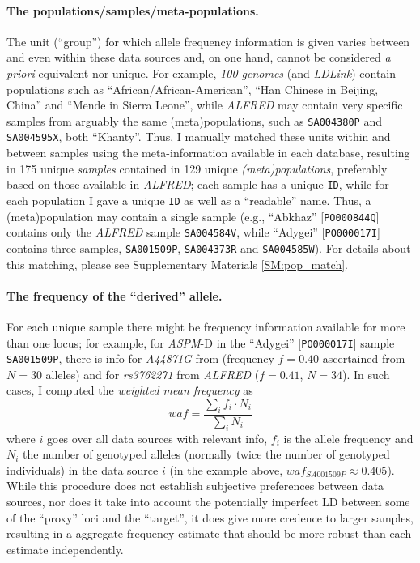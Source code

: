 \documentclass[twoside,onecolumn]{article}
\begin{document}
\paragraph{The populations/samples/meta-populations.}
The unit (``group'') for which allele frequency information is given varies between and even within these data sources and, on one hand, cannot be considered \textit{a priori} equivalent nor unique.
For example, \textit{100 genomes} (and \textit{LDLink}) contain populations such as ``African/African-American'', ``Han Chinese in Beijing, China'' and ``Mende in Sierra Leone'', while \textit{ALFRED} may contain very specific samples from arguably the same (meta)populations, such as \texttt{SA004380P} and \texttt{SA004595X}, both ``Khanty''.
Thus, I manually matched these units within and between samples using the meta-information available in each database, resulting in 175 unique \emph{samples} contained in 129 unique \emph{(meta)populations}, preferably based on those available in \textit{ALFRED}; each sample has a unique \texttt{ID}, while for each population I gave a unique \texttt{ID} as well as a ``readable'' name.
Thus, a (meta)population may contain a single sample (e.g., ``Abkhaz'' [\texttt{PO000844Q}] contains only the \textit{ALFRED} sample \texttt{SA004584V}, while ``Adygei'' [\texttt{PO000017I}] contains three samples, \texttt{SA001509P}, \texttt{SA004373R} and \texttt{SA004585W}).
For details about this matching, please see Supplementary Materials \ref{SM:pop_match}.

\paragraph{The frequency of the ``derived'' allele.}
For each unique sample there might be frequency information available for more than one locus; for example, for \textit{ASPM}-D in the ``Adygei'' [\texttt{PO000017I}] sample \texttt{SA001509P}, there is info for \textit{A44871G} from \citet{mekelbobrov_aspm_2005} (frequency $f=0.40$ ascertained from $N=30$ alleles) and for \textit{rs3762271} from \textit{ALFRED} ($f=0.41$, $N=34$).
In such cases, I computed the \emph{weighted mean frequency} as
$$waf = \frac{\sum_{i}{f_{i} \cdot N_{i}}}{\sum_{i}{N_{i}}}$$
where $i$ goes over all data sources with relevant info, $f_{i}$ is the allele frequency and $N_{i}$ the number of genotyped alleles (normally twice the number of genotyped individuals) in the data source $i$ (in the example above, $waf_{SA001509P} \approx 0.405$).
While this procedure does not establish subjective preferences between data sources, nor does it take into account the potentially imperfect LD between some of the ``proxy'' loci and the ``target'', it does give more credence to larger samples, resulting in a aggregate frequency estimate that should be more robust than each estimate independently.
\end{document}
